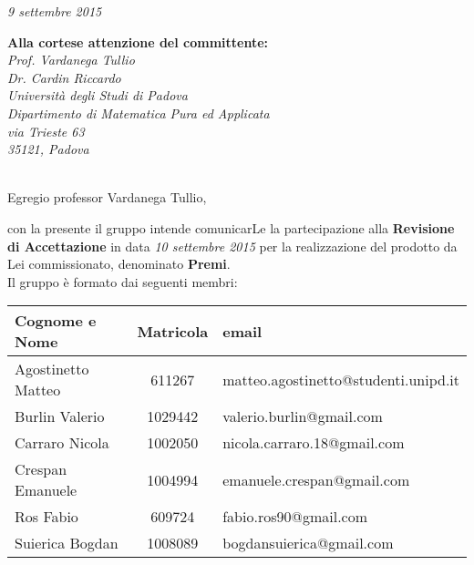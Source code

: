 \begin{flushright}
	\textit{9 settembre 2015} \\
\end{flushright}

\noindent \textbf{Alla cortese attenzione del committente:}\\
\textit{
	Prof. Vardanega Tullio\\
	Dr. Cardin Riccardo\\
	Università degli Studi di Padova\\
	Dipartimento di Matematica Pura ed Applicata\\
	via Trieste 63\\
	35121, Padova\\ \\
}


\noindent Egregio professor Vardanega Tullio,

con la presente il gruppo \GRUPPO intende comunicarLe la partecipazione alla \textbf{Revisione di Accettazione} in data \textit{10 settembre 2015} per la realizzazione del prodotto da Lei commissionato, denominato \textbf{Premi}.\\


\noindent Il gruppo è formato dai seguenti membri:\\

\begin{tabular}{|l|c|l|}
	\toprule
		\textbf{Cognome e Nome}  & \textbf{Matricola}  & \textbf{email}  \\ \midrule
		Agostinetto Matteo  & 611267 & matteo.agostinetto@studenti.unipd.it \\ 
		Burlin Valerio & 1029442 & valerio.burlin@gmail.com \\ 
		Carraro Nicola & 1002050 & nicola.carraro.18@gmail.com \\ 
		Crespan Emanuele & 1004994 & emanuele.crespan@gmail.com \\ 
		Ros Fabio & 609724 & fabio.ros90@gmail.com \\ 
		Suierica Bogdan  & 1008089 & bogdansuierica@gmail.com \\
		
	\bottomrule
\end{tabular}

\vspace{20px}

